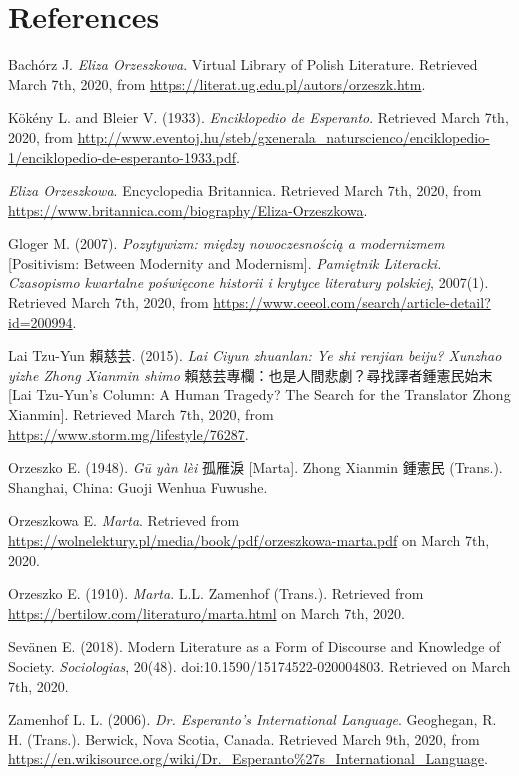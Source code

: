 \chapter*{References}

Bachórz J. \textit{Eliza Orzeszkowa}. Virtual Library of Polish Literature. Retrieved March 7th, 2020, from \url{https://literat.ug.edu.pl/autors/orzeszk.htm}.

Kökény L. and Bleier V. (1933). \textit{Enciklopedio de Esperanto}. Retrieved March 7th, 2020, from \url{http://www.eventoj.hu/steb/gxenerala_naturscienco/enciklopedio-1/enciklopedio-de-esperanto-1933.pdf}.

\textit{Eliza Orzeszkowa}. Encyclopedia Britannica. Retrieved March 7th, 2020, from \url{https://www.britannica.com/biography/Eliza-Orzeszkowa}.

Gloger M. (2007). \textit{Pozytywizm: między nowoczesnością a modernizmem} [Positivism: Between Modernity and Modernism]. \textit{Pamiętnik Literacki. Czasopismo kwartalne poświęcone historii i krytyce literatury polskiej}, 2007(1). Retrieved March 7th, 2020, from \url{https://www.ceeol.com/search/article-detail?id=200994}.

Lai Tzu-Yun 賴慈芸. (2015). \textit{Lai Ciyun zhuanlan: Ye shi renjian beiju? Xunzhao yizhe Zhong Xianmin shimo} 賴慈芸專欄：也是人間悲劇？尋找譯者鍾憲民始末 [Lai Tzu-Yun's Column: A Human Tragedy? The Search for the Translator Zhong Xianmin]. Retrieved March 7th, 2020, from \url{https://www.storm.mg/lifestyle/76287}.

Orzeszko E. (1948). \textit{Gū yàn lèi} 孤雁淚 [Marta]. Zhong Xianmin 鍾憲民 (Trans.). Shanghai, China: Guoji Wenhua Fuwushe.

Orzeszkowa E. \textit{Marta}. Retrieved from \url{https://wolnelektury.pl/media/book/pdf/orzeszkowa-marta.pdf} on March 7th, 2020.

Orzeszko E. (1910). \textit{Marta}. L.L. Zamenhof (Trans.). Retrieved from \url{https://bertilow.com/literaturo/marta.html} on March 7th, 2020.

Sevänen E. (2018). Modern Literature as a Form of Discourse and Knowledge of Society. \textit{Sociologias}, 20(48). doi:10.1590/15174522-020004803. Retrieved on March 7th, 2020.

Zamenhof L. L. (2006). \textit{Dr. Esperanto's International Language}. Geoghegan, R. H. (Trans.). Berwick, Nova Scotia, Canada. Retrieved March 9th, 2020, from \url{https://en.wikisource.org/wiki/Dr._Esperanto\%27s_International_Language}.